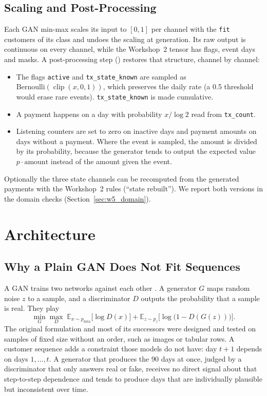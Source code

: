 \documentclass{article}
\newcommand{\E}{\mathbb{E}}
\begin{document}
\subsection{Scaling and Post-Processing}

Each GAN min-max scales its input to $[0,1]$ per channel with the \texttt{fit} customers of its class and undoes the scaling at generation. Its raw output is continuous on every channel, while the Workshop~2 tensor has flags, event days and masks. A post-processing step () restores that structure, channel by channel:
\begin{itemize}
    \item The flags \texttt{active} and \texttt{tx\_state\_known} are sampled as $\text{Bernoulli}(\operatorname{clip}(x,0,1))$, which preserves the daily rate (a 0.5 threshold would erase rare events). \texttt{tx\_state\_known} is made cumulative.
    \item A payment happens on a day with probability $x / \log 2$ read from \texttt{tx\_count}.
    \item Listening counters are set to zero on inactive days and payment amounts on days without a payment. Where the event is sampled, the amount is divided by its probability, because the generator tends to output the expected value $p \cdot \text{amount}$ instead of the amount given the event.
\end{itemize}
Optionally the three state channels can be recomputed from the generated payments with the Workshop~2 rules (``state rebuilt''). We report both versions in the domain checks (Section~\ref{sec:w5_domain}).

\section{Architecture}

\subsection{Why a Plain GAN Does Not Fit Sequences}

A GAN trains two networks against each other \cite{goodfellow2014}. A generator $G$ maps random noise $z$ to a sample, and a discriminator $D$ outputs the probability that a sample is real. They play
\begin{equation}
\min_G \max_D \; \E_{x \sim p_{\text{data}}}\big[\log D(x)\big] + \E_{z \sim p_z}\big[\log\big(1 - D(G(z))\big)\big].
\end{equation}
The original formulation and most of its successors were designed and tested on samples of fixed size without an order, such as images or tabular rows. A customer sequence adds a constraint those models do not have: day $t+1$ depends on days $1, \dots, t$. A generator that produces the 90 days at once, judged by a discriminator that only answers real or fake, receives no direct signal about that step-to-step dependence and tends to produce days that are individually plausible but inconsistent over time.
\end{document}

